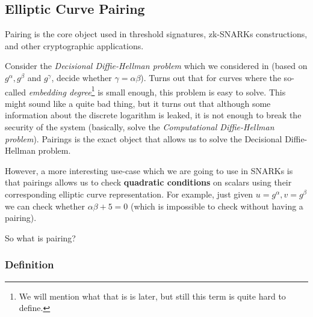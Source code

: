 \documentclass[../lecture-notes.tex]{subfiles}
\begin{document}
\subsection{Elliptic Curve Pairing}

Pairing is the core object used in threshold signatures, zk-SNARKs constructions, and other cryptographic applications. 

Consider the \textit{Decisional Diffie-Hellman problem} which we considered in  (based on $g^{\alpha},g^{\beta}$ and $g^{\gamma}$, decide whether $\gamma = \alpha\beta$). Turns out that for curves where the so-called \textit{embedding degree}\footnote{We will mention what that is is later, but still this term is quite hard to define.} is small enough, this problem is easy to solve. This might sound 
like a quite bad thing, but it turns out that although some information about the discrete logarithm is leaked, it is not enough to break the security of the system (basically, solve the \textit{Computational Diffie-Hellman problem}). 
Pairings is the exact object that allows us to solve the Decisional Diffie-Hellman problem.

However, a more interesting use-case which we are going to use in SNARKs is that pairings allows us to check \textbf{quadratic conditions} on scalars using their corresponding elliptic curve representation. For example, just given $u=g^{\alpha},v=g^{\beta}$ we can check whether $\alpha\beta+5=0$ (which is impossible to check without having a pairing). 

So what is pairing?

\subsubsection{Definition}
\end{document}
